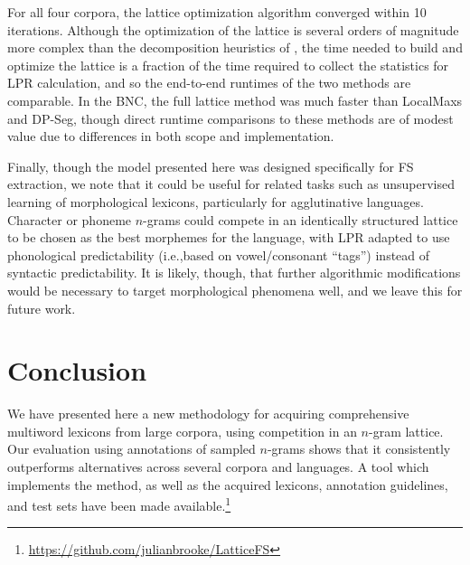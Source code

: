 \documentclass[11pt,letterpaper]{article}
\makeatletter
\def \ie {i.e.,\@ }
\makeatother
\begin{document}
For all four corpora, the lattice optimization algorithm converged within 10 iterations.  Although the optimization of the lattice is several orders of magnitude more complex than the decomposition heuristics of , the time needed to build and optimize the lattice is a fraction of the time required to collect the statistics for LPR calculation, and so the end-to-end runtimes of the two methods are comparable. In the BNC, the full lattice method was much faster than LocalMaxs and DP-Seg, though direct runtime comparisons to these methods are of modest value due to differences in both scope and implementation.



Finally, though the model presented here was designed specifically for FS extraction, we note that it could be useful for related tasks such as unsupervised learning of morphological lexicons, particularly for agglutinative languages. Character or phoneme $n$-grams could compete in an identically structured lattice to be chosen as the best morphemes for the language, with LPR adapted to use phonological predictability (\ie based on vowel/consonant ``tags'') instead of syntactic predictability. It is likely, though, that further algorithmic modifications would be necessary to target morphological phenomena well, and we leave this for future work.

\section{Conclusion}

We have presented here a new methodology for acquiring comprehensive multiword lexicons from large corpora, using competition in an $n$-gram lattice. Our evaluation using annotations of sampled $n$-grams shows that it consistently outperforms alternatives across several corpora and languages. A tool which implements the method, as well as the acquired lexicons, annotation guidelines, and test sets have been made available.\footnote{\url{https://github.com/julianbrooke/LatticeFS}}
\end{document}
